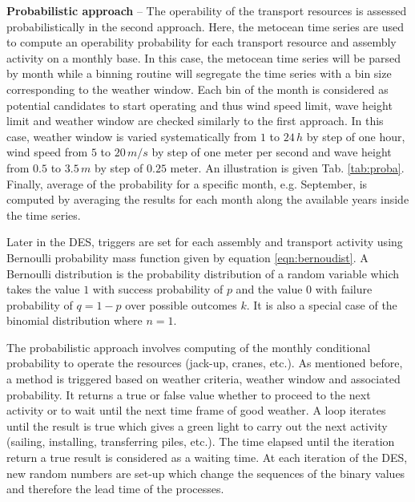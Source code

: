 \textbf{Probabilistic approach} -- The operability of the transport resources is assessed probabilistically in the second approach. Here, the metocean time series are used to compute an operability probability for each transport resource and assembly activity on a monthly base. In this case, the metocean time series will be parsed by month while a binning routine will segregate the time series with a bin size corresponding to the weather window. Each bin of the month is considered as potential candidates to start operating and thus wind speed limit, wave height limit and weather window are checked similarly to the first approach. In this case, weather window is varied systematically from $1$ to $24\, h$ by step of one hour, wind speed from $5$ to $20\, m/s$ by step of one meter per second and wave height from $0.5$ to $3.5\, m$ by step of $0.25$ meter.
An illustration is given Tab. \ref{tab:proba}.
Finally, average of the probability for a specific month, e.g. September, is computed by averaging the results for each month along the available years inside the time series.


Later in the DES, triggers are set for each assembly and transport activity using Bernoulli probability mass function given by equation \ref{eqn:bernoudist}. A Bernoulli distribution is the probability distribution of a random variable which takes the value $1$ with success probability of $p$ and the value $0$ with failure probability of $q=1-p$ over possible outcomes $k$. It is also a special case of the binomial distribution where $n=1$.

The probabilistic approach involves computing of the monthly conditional probability to operate the resources (jack-up, cranes, etc.). As mentioned before, a method is triggered based on weather criteria, weather window and associated probability. It returns a true or false value whether to proceed to the next activity or to wait until the next time frame of good weather. A loop iterates until the result is true which gives a green light to carry out the next activity (sailing, installing, transferring piles, etc.). The time elapsed until the iteration return a true result is considered as a waiting time. At each iteration of the DES, new random numbers are set-up which change the sequences of the binary values and therefore the lead time of the processes.

